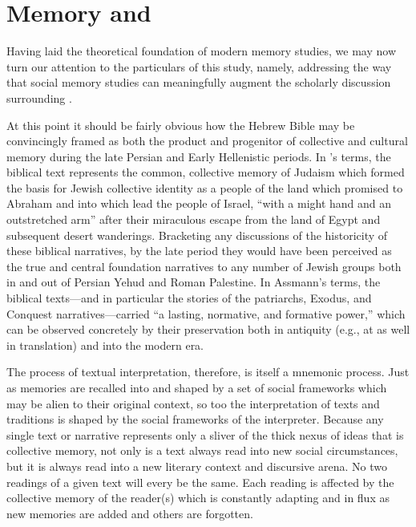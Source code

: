 
\section{Memory and \RwB}

Having laid the theoretical foundation of modern memory studies, we may now turn our attention to the particulars of this study, namely, addressing the way that social memory studies can meaningfully augment the scholarly discussion surrounding \rwb.\autocite[See also][]{brooke_zsengeller2014}  

At this point it should be fairly obvious how the Hebrew Bible may be convincingly framed as both the product and progenitor of collective and cultural memory during the late Persian and Early Hellenistic periods. In \halbwachs's terms, the biblical text represents the common, collective memory of \secondtemple Judaism which formed the basis for Jewish collective identity as a people of the land which \yahweh promised to Abraham and into which \yahweh lead the people of Israel, ``with a might hand and an outstretched arm'' after their miraculous escape from the land of Egypt and subsequent desert wanderings. Bracketing any discussions of the historicity of these biblical narratives, by the late \secondtemple period they would have been perceived as the true and central foundation narratives to any number of Jewish groups both in and out of Persian Yehud and Roman Palestine. In Assmann's terms, the biblical texts---and in particular the stories of the patriarchs, Exodus, and Conquest narratives---carried ``a lasting, normative, and formative power,''\autocite[38]{assmann2011} which can be observed concretely by their preservation both in antiquity (e.g., at \qumran as well in translation) and into the modern era.  

The process of textual interpretation, therefore, is itself a mnemonic process. Just as memories are recalled into and shaped by a set of social frameworks which may be alien to their original context, so too the interpretation of texts and traditions is shaped by the social frameworks of the interpreter. Because any single text or narrative represents only a sliver of the thick nexus of ideas that is collective memory, not only is a text always read into new social circumstances, but it is always read into a new literary context and discursive arena. No two readings of a given text will every be the same. Each reading is affected by the collective memory of the reader(s) which is constantly adapting and in flux as new memories are added and others are forgotten.  

